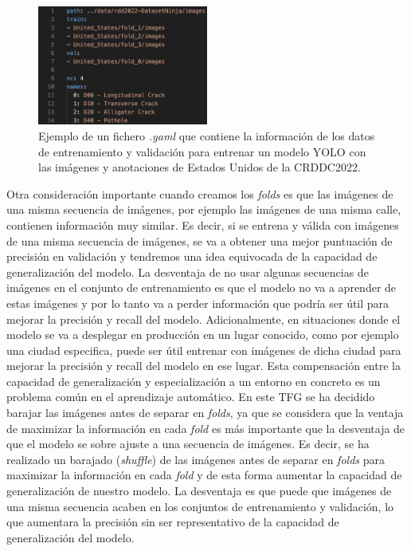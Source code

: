 \begin{figure}[H]
    \centering
    \includegraphics[width=0.5\textwidth]{img/yaml_example.png}
    \caption{Ejemplo de un fichero \textit{.yaml} que contiene la información de los datos de entrenamiento y validación para entrenar un modelo YOLO con las imágenes y anotaciones de Estados Unidos de la CRDDC2022.}
    \label{fig:yaml_example}
\end{figure}

Otra consideración importante cuando creamos los \textit{folds} es que las imágenes de una misma secuencia de imágenes, por ejemplo las imágenes de una misma calle, contienen información muy similar. Es decir, si se entrena y válida con imágenes de una misma secuencia de imágenes, se va a obtener una mejor puntuación de precisión en validación y tendremos una idea equivocada de la capacidad de generalización del modelo. La desventaja de no usar algunas secuencias de imágenes en el conjunto de entrenamiento es que el modelo no va a aprender de estas imágenes y por lo tanto va a perder información que podría ser útil para mejorar la precisión y recall del modelo. Adicionalmente, en situaciones donde el modelo se va a desplegar en producción en un lugar conocido, como por ejemplo una ciudad especifica, puede ser útil entrenar con imágenes de dicha ciudad para mejorar la precisión y recall del modelo en ese lugar. Esta compensación entre la capacidad de generalización y especialización a un entorno en concreto es un problema común en el aprendizaje automático. En este TFG se ha decidido barajar las imágenes antes de separar en \textit{folds}, ya que se considera que la ventaja de maximizar la información en cada \textit{fold} es más importante que la desventaja de que el modelo se sobre ajuste a una secuencia de imágenes. Es decir, se ha realizado un barajado (\textit{shuffle}) de las imágenes antes de separar en \textit{folds} para maximizar la información en cada \textit{fold} y de esta forma aumentar la capacidad de generalización de nuestro modelo. La desventaja es que puede que imágenes de una misma secuencia acaben en los conjuntos de entrenamiento y validación, lo que aumentara la precisión sin ser representativo de la capacidad de generalización del modelo.